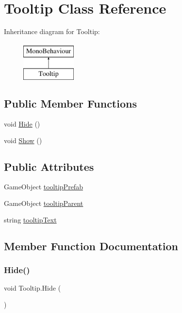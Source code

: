 \hypertarget{classTooltip}{}\section{Tooltip Class Reference}
\label{classTooltip}
Inheritance diagram for Tooltip\+:\begin{figure}[H]
\begin{center}
\leavevmode
\includegraphics[height=2.000000cm]{classTooltip}
\end{center}
\end{figure}
\subsection*{Public Member Functions}
\begin{DoxyCompactItemize}
\item 
void \hyperlink{classTooltip_aa3f2576744ee716d7e410d31e8c2015a}{Hide} ()
\item 
void \hyperlink{classTooltip_ad15715a262e1c7c27db36cba7da3149f}{Show} ()
\end{DoxyCompactItemize}
\subsection*{Public Attributes}
\begin{DoxyCompactItemize}
\item 
Game\+Object \hyperlink{classTooltip_a9e16563f3ea6f787045747f3bbc9cf9e}{tooltip\+Prefab}
\item 
Game\+Object \hyperlink{classTooltip_a58db06fa78d7d032bee7492976b4465c}{tooltip\+Parent}
\item 
string \hyperlink{classTooltip_ae1fbc466dbee2cd63d8b68df52f5b284}{tooltip\+Text}
\end{DoxyCompactItemize}


\subsection{Member Function Documentation}
\mbox{\label{classTooltip_aa3f2576744ee716d7e410d31e8c2015a}} 
\subsubsection{\texorpdfstring{Hide()}{Hide()}}
{\footnotesize\ttfamily void Tooltip.\+Hide (\begin{DoxyParamCaption}{ }\end{DoxyParamCaption})\hspace{0.3cm}{\ttfamily [inline]}}

